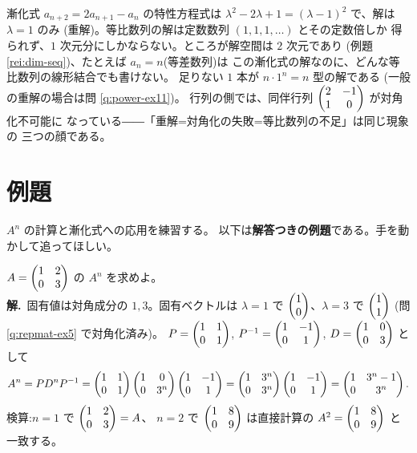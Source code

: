 \begin{hanrei}[特性方程式が重解のときは等比数列だけでは足りない]\label{hanrei:power-double}
漸化式 $a_{n+2} = 2a_{n+1} - a_n$ の特性方程式は
$\lambda^2 - 2\lambda + 1 = (\lambda - 1)^2$ で、解は $\lambda = 1$ のみ
(重解)。等比数列の解は定数数列 $(1, 1, 1, \dots)$ とその定数倍しか
得られず、$1$ 次元分にしかならない。ところが解空間は $2$ 次元であり
(例題 \ref{rei:dim-seq})、たとえば $a_n = n$(等差数列)は
この漸化式の解なのに、どんな等比数列の線形結合でも書けない。
足りない $1$ 本が $n \cdot 1^n = n$ 型の解である
(一般の重解の場合は問 \ref{q:power-ex11})。
行列の側では、同伴行列 $\begin{pmatrix}2 & -1 \\ 1 & 0\end{pmatrix}$ が対角化不可能に
なっている――「重解=対角化の失敗=等比数列の不足」は同じ現象の
三つの顔である。
\end{hanrei}

\section{例題}

$A^n$ の計算と漸化式への応用を練習する。
以下は\textbf{解答つきの例題}である。手を動かして追ってほしい。

\begin{rei}[例題・基本(三角行列のべき乗)]\label{rei:power-tri}
$A = \begin{pmatrix}1 & 2 \\ 0 & 3\end{pmatrix}$ の $A^n$ を求めよ。\\
\textbf{解.}\ 固有値は対角成分の $1, 3$。固有ベクトルは
$\lambda = 1$ で $\begin{pmatrix}1 \\ 0\end{pmatrix}$、$\lambda = 3$ で $\begin{pmatrix}1 \\ 1\end{pmatrix}$
(問 \ref{q:repmat-ex5} で対角化済み)。
$P = \begin{pmatrix}1 & 1 \\ 0 & 1\end{pmatrix}$, $P^{-1} = \begin{pmatrix}1 & -1 \\ 0 & 1\end{pmatrix}$,
$D = \begin{pmatrix}1 & 0 \\ 0 & 3\end{pmatrix}$ として
\[
A^n = PD^nP^{-1}
= \begin{pmatrix}1 & 1 \\ 0 & 1\end{pmatrix}\begin{pmatrix}1 & 0 \\ 0 & 3^n\end{pmatrix}\begin{pmatrix}1 & -1 \\ 0 & 1\end{pmatrix}
= \begin{pmatrix}1 & 3^n \\ 0 & 3^n\end{pmatrix}\begin{pmatrix}1 & -1 \\ 0 & 1\end{pmatrix}
= \begin{pmatrix}1 & 3^n - 1 \\ 0 & 3^n\end{pmatrix}.
\]
検算:$n = 1$ で $\begin{pmatrix}1 & 2 \\ 0 & 3\end{pmatrix} = A$、
$n = 2$ で $\begin{pmatrix}1 & 8 \\ 0 & 9\end{pmatrix}$ は直接計算の
$A^2 = \begin{pmatrix}1 & 8 \\ 0 & 9\end{pmatrix}$ と一致する。
\end{rei}


